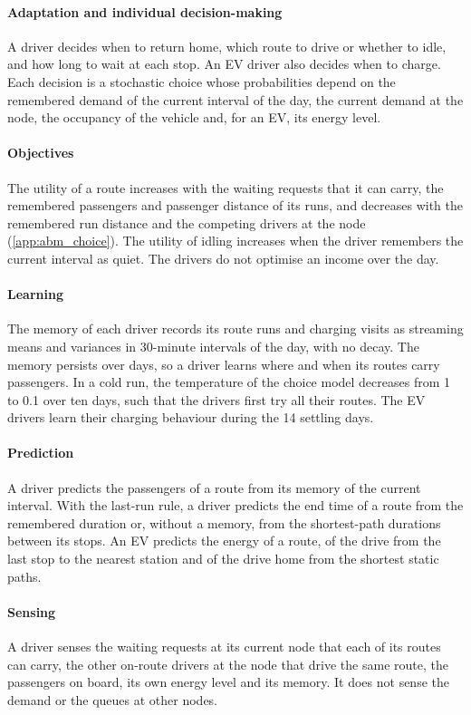 \paragraph{Adaptation and individual decision-making} A driver decides when to return home, which route to drive or whether to idle, and how long to wait at each stop. An EV driver also decides when to charge. Each decision is a stochastic choice whose probabilities depend on the remembered demand of the current interval of the day, the current demand at the node, the occupancy of the vehicle and, for an EV, its energy level.

\paragraph{Objectives} The utility of a route increases with the waiting requests that it can carry, the remembered passengers and passenger distance of its runs, and decreases with the remembered run distance and the competing drivers at the node (\ref{app:abm_choice}). The utility of idling increases when the driver remembers the current interval as quiet. The drivers do not optimise an income over the day.

\paragraph{Learning} The memory of each driver records its route runs and charging visits as streaming means and variances in 30-minute intervals of the day, with no decay. The memory persists over days, so a driver learns where and when its routes carry passengers. In a cold run, the temperature of the choice model decreases from 1 to 0.1 over ten days, such that the drivers first try all their routes. The EV drivers learn their charging behaviour during the 14 settling days.

\paragraph{Prediction} A driver predicts the passengers of a route from its memory of the current interval. With the last-run rule, a driver predicts the end time of a route from the remembered duration or, without a memory, from the shortest-path durations between its stops. An EV predicts the energy of a route, of the drive from the last stop to the nearest station and of the drive home from the shortest static paths.

\paragraph{Sensing} A driver senses the waiting requests at its current node that each of its routes can carry, the other on-route drivers at the node that drive the same route, the passengers on board, its own energy level and its memory. It does not sense the demand or the queues at other nodes.

